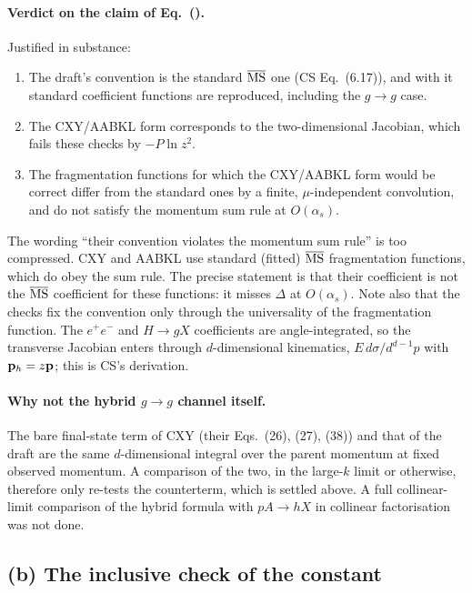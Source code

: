 \paragraph{Verdict on the claim of Eq.~().} Justified in substance:
\begin{enumerate}
\item The draft's convention is the standard $\overline{\rm MS}$ one (CS Eq.~(6.17)), and with it standard coefficient functions are reproduced, including the $g\to g$ case.
\item The CXY/AABKL form corresponds to the two-dimensional Jacobian, which fails these checks by $-P\ln z^2$.
\item The fragmentation functions for which the CXY/AABKL form would be correct differ from the standard ones by a finite, $\mu$-independent convolution, and do not satisfy the momentum sum rule at $O(\alpha_s)$.
\end{enumerate}
The wording ``their convention violates the momentum sum rule'' is too compressed. CXY and AABKL use standard (fitted) $\overline{\rm MS}$ fragmentation functions, which do obey the sum rule. The precise statement is that their coefficient is not the $\overline{\rm MS}$ coefficient for these functions: it misses $\Delta$ at $O(\alpha_s)$. Note also that the checks fix the convention only through the universality of the fragmentation function. The $e^+e^-$ and $H\to gX$ coefficients are angle-integrated, so the transverse Jacobian enters through $d$-dimensional kinematics, $E\,d\sigma/d^{d-1}p$ with $\mathbf{p}_h=z\mathbf{p}$; this is CS's derivation.

\paragraph{Why not the hybrid $g\to g$ channel itself.} The bare final-state term of CXY (their Eqs.~(26), (27), (38)) and that of the draft are the same $d$-dimensional integral over the parent momentum at fixed observed momentum. A comparison of the two, in the large-$k$ limit or otherwise, therefore only re-tests the counterterm, which is settled above. A full collinear-limit comparison of the hybrid formula with $pA\to hX$ in collinear factorisation was not done.

\subsection{(b) The inclusive check of the constant}\label{sec:c-b}

